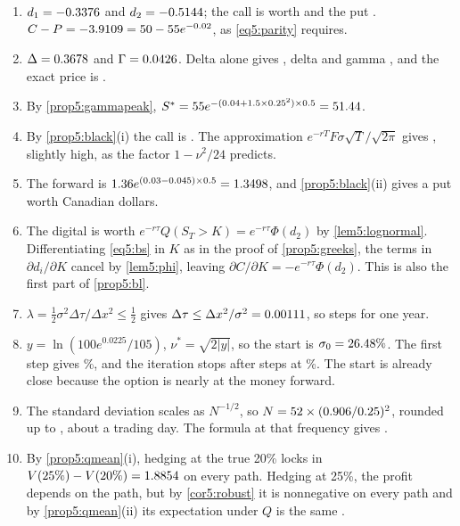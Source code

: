 \begin{chapterrefs}
\begin{enumerate}[label=\textbf{5.\arabic*}, leftmargin=*]
  \item $d_1=-0.3376$ and $d_2=-0.5144$; the call is worth \xvOneCall{} and the put \xvOnePut.
  $C-P=-3.9109=50-55e^{-0.02}$, as \cref{eq5:parity} requires.
  \item $\Delta=0.3678$ and $\Gamma=0.0426$. Delta alone gives \xvTwoDeltaOnly, delta and gamma
  \xvTwoApprox, and the exact price is \xvTwoExact.
  \item By \cref{prop5:gammapeak}, $S^*=55e^{-(0.04+1.5\times0.25^2)\times0.5}=51.44$.
  \item By \cref{prop5:black}(i) the call is \xvFourCall. The approximation
  $e^{-rT}F\sigma\sqrt T/\sqrt{2\pi}$ gives \xvFourApprox, slightly high, as the factor $1-\nu^2/24$ predicts.
  \item The forward is $1.36e^{(0.03-0.045)\times0.5}=1.3498$, and \cref{prop5:black}(ii) gives a put
  worth \xvFivePut{} Canadian dollars.
  \item The digital is worth $e^{-r\tau}Q(S_T>K)=e^{-r\tau}\Phi(d_2)$ by \cref{lem5:lognormal}.
  Differentiating \cref{eq5:bs} in $K$ as in the proof of \cref{prop5:greeks}, the terms in
  $\partial d_i/\partial K$ cancel by \cref{lem5:phi}, leaving $\partial C/\partial K=-e^{-r\tau}\Phi(d_2)$.
  This is also the first part of \cref{prop5:bl}.
  \item $\lambda=\tfrac12\sigma^2\Delta\tau/\Delta x^2\le\tfrac12$ gives $\Delta\tau\le\Delta x^2/\sigma^2=0.00111$,
  so \xvSevenSteps{} steps for one year.
  \item $y=\ln(100e^{0.0225}/105)$, $\nu^*=\sqrt{2|y|}$, so the start is $\sigma_0=26.48\%$. The
  first step gives \xvEightFirst\%, and the iteration stops after \xvEightIter{} steps at \xvEightSig\%.
  The start is already close because the option is nearly at the money forward.
  \item The standard deviation scales as $N^{-1/2}$, so $N=52\times(0.906/0.25)^2$, rounded up to
  \xvNineN, about \xvNinePerDay{} a trading day. The formula at that frequency gives \xvNineCheck.
  \item By \cref{prop5:qmean}(i), hedging at the true 20\% locks in $V(25\%)-V(20\%)=1.8854$ on every
  path. Hedging at 25\%, the profit depends on the path, but by \cref{cor5:robust} it is nonnegative on
  every path and by \cref{prop5:qmean}(ii) its expectation under $Q$ is the same \xvTenGap.
\end{enumerate}


\end{chapterrefs}
